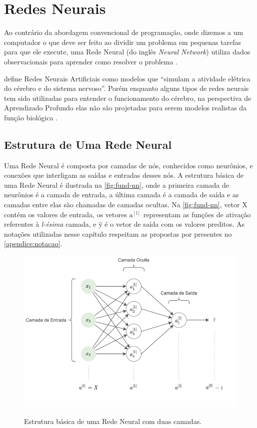 \section{Redes Neurais} \label{cap:fund-ia-rn}
Ao contrário da abordagem convencional de programação, onde dizemos a um computador o que deve ser feito ao dividir um problema em pequenas tarefas para que ele execute, uma Rede Neural (do inglês \textit{Neural Network}) utiliza dados observacionais para aprender como resolver o problema \cite{ref:Nielsen}.

 define Redes Neurais Artificiais como modelos que ``simulam a atividade elétrica do cérebro e do sistema nervoso''. Porém enquanto alguns tipos de redes neurais tem sido utilizadas para entender o funcionamento do cérebro, na perspectiva de Aprendizado Profundo elas não são projetadas para serem modelos realistas da função biológica \cite{ref:Goodfellow-Bengio-Courville}.

\subsection{Estrutura de Uma Rede Neural} \label{cap:fund-ia-rn-estrutura}
Uma Rede Neural é composta por camadas de nós, conhecidos como neurônios, e conexões que interligam as saídas e entradas desses nós. A estrutura básica de uma Rede Neural é ilustrada na \autoref{fig:fund-nn}, onde a primeira camada de neurônios é a camada de entrada, a última camada é a camada de saída e as camadas entre elas são chamadas de camadas ocultas. Na \autoref{fig:fund-nn}, vetor $\mathrm{X}$ contém os valores de entrada, os vetores $\mathrm{a^{[l]}}$ representam as funções de ativação referentes à \textit{l-ésima} camada, e $\mathrm{\hat{y}}$ é o vetor de saída com os valores preditos. As notações utilizadas nesse capítulo respeitam as propostas por  presentes no \autoref{apendice:notacao}.

\begin{figure}[h!] %
  \centering
  \caption{Estrutura básica de uma Rede Neural com duas camadas.}
  \includegraphics[scale=1.1]{img/img-fundamentacao-nn.pdf}
  \label{fig:fund-nn}
\end{figure}

